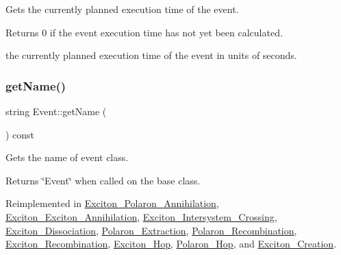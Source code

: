 Gets the currently planned execution time of the event. 

\begin{DoxyReturn}{Returns}
0 if the event execution time has not yet been calculated. 

the currently planned execution time of the event in units of seconds. 
\end{DoxyReturn}
\mbox{\label{class_event_a8c38a406d844d05eac1ef007bad2487f}} 
\subsubsection{\texorpdfstring{get\+Name()}{getName()}}
{\footnotesize\ttfamily string Event\+::get\+Name (\begin{DoxyParamCaption}{ }\end{DoxyParamCaption}) const\hspace{0.3cm}{\ttfamily [virtual]}}



Gets the name of event class. 

\begin{DoxyReturn}{Returns}
\char`\"{}\+Event\char`\"{} when called on the base class. 
\end{DoxyReturn}


Reimplemented in \hyperlink{class_exciton___polaron___annihilation_aea3ae0f18ba7743d2183c2c5fbf4d4c4}{Exciton\+\_\+\+Polaron\+\_\+\+Annihilation}, \hyperlink{class_exciton___exciton___annihilation_a7027d2bee875a346e4c7ec4f07c55816}{Exciton\+\_\+\+Exciton\+\_\+\+Annihilation}, \hyperlink{class_exciton___intersystem___crossing_aa9a743fa3ab0ebc24abeaacef0590488}{Exciton\+\_\+\+Intersystem\+\_\+\+Crossing}, \hyperlink{class_exciton___dissociation_a1cfdbcfa3930666e0fddea28cc18ac9e}{Exciton\+\_\+\+Dissociation}, \hyperlink{class_polaron___extraction_a30cc8c9489f69e24feda42c035adc9cf}{Polaron\+\_\+\+Extraction}, \hyperlink{class_polaron___recombination_a0075250a377d6fccb8f64e4d173c9041}{Polaron\+\_\+\+Recombination}, \hyperlink{class_exciton___recombination_ac4142920b4692cdc107b0e877c7c8310}{Exciton\+\_\+\+Recombination}, \hyperlink{class_exciton___hop_a8e08c3992b06fa0efe7db438a381445b}{Exciton\+\_\+\+Hop}, \hyperlink{class_polaron___hop_adbb1a3f86bd6a2dd21849bfec5598d70}{Polaron\+\_\+\+Hop}, and \hyperlink{class_exciton___creation_aba92afc6c2aa48ce15c59c9e7310c636}{Exciton\+\_\+\+Creation}.

